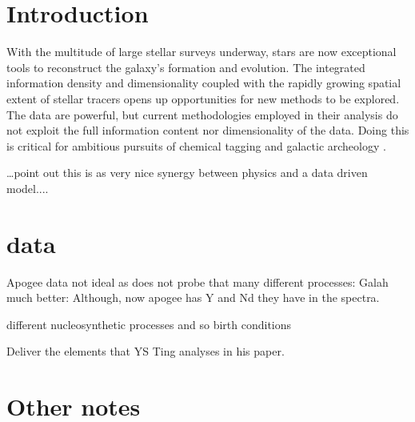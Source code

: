 \documentclass[12pt, preprint]{aastex}
\newcommand{\project}[1]{\textsl{#1}}
\newcommand{\tc}{\project{The~Cannon}}
\begin{document}
\begin{abstract}


\end{abstract}


\section{Introduction}\label{sec:Intro}

With the multitude of large stellar surveys underway, stars are now exceptional tools to reconstruct the galaxy's formation and evolution. 
The integrated information density and dimensionality coupled with the rapidly growing spatial extent of stellar tracers opens up opportunities for new methods to be explored. The data are powerful, but current methodologies employed in their analysis do not exploit the full information content nor dimensionality of the data. Doing this is critical for ambitious pursuits of chemical tagging \citep[e.g.][]{Ting2015} and galactic archeology \citep{Freeman2002, Martell2015}. 

\ldots point out this is as very nice synergy between physics and a data driven model....

\section{data}

Apogee data not ideal as does not probe that many different processes: Galah much better: Although, now apogee has Y and Nd they have in the spectra. 

different nucleosynthetic processes and so birth conditions

Deliver the elements that YS Ting analyses in his paper. 


\section{Other notes} 
\end{document}
